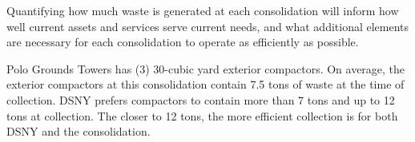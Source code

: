 
    Quantifying how much waste is generated at each consolidation will inform how well current assets and services serve current needs, and what additional elements are necessary for each consolidation to operate as efficiently as possible.
    
    Polo Grounds Towers has (3) 30-cubic yard exterior compactors. On average, the exterior compactors at this consolidation contain 7.5 tons of waste at the time of collection. DSNY prefers compactors to contain more than 7 tons and up to 12 tons at collection. The closer to 12 tons, the more efficient collection is for both DSNY and the consolidation.